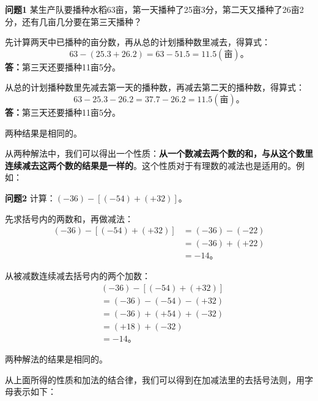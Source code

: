 \textbf{问题1} 某生产队要播种水稻63亩，第一天播种了25亩3分，第二天又播种了26亩2分，还有几亩几分要在第三天播种？

 先计算两天中已播种的亩分数，再从总的计划播种数里减去，得算式：
\[
63 - (25.3 + 26.2) = 63 - 51.5 = 11.5 (\text{亩})。
\]
\textbf{答：}第三天还要播种11亩5分。

 从总的计划播种数里先减去第一天的播种数，再减去第二天的播种数，得算式：
\[
63 - 25.3 - 26.2 = 37.7 - 26.2 = 11.5 (\text{亩})。
\]
\textbf{答：}第三天还要播种11亩5分。

两种结果是相同的。

从两种解法中，我们可以得出一个性质：\textbf{从一个数减去两个数的和，与从这个数里连续减去这两个数的结果是一样的}。这个性质对于有理数的减法也是适用的。例如：

\textbf{问题2} 计算：$(-36) - [(-54) + (+32)]$。

 先求括号内的两数和，再做减法：
\begin{align*}
(-36) - [(-54) + (+32)] &= (-36) - (-22) \\
&= (-36) + (+22) \\
&= -14。
\end{align*}

 从被减数连续减去括号内的两个加数：
\begin{align*}
&(-36) - [(-54) + (+32)] \\
&= (-36) - (-54) - (+32) \\
&= (-36) + (+54) + (-32) \\
&= (+18) + (-32) \\
&= -14。
\end{align*}

两种解法的结果是相同的。

从上面所得的性质和加法的结合律，我们可以得到在加减法里的去括号法则，用字母表示如下：

\begin{center}
\end{center}

